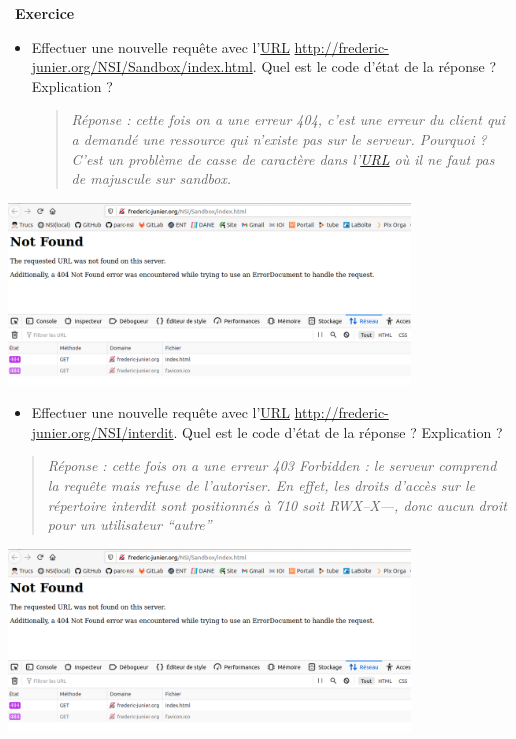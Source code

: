 \documentclass[
  11pt,
]{article}
\providecommand{\tightlist}{%
  \setlength{\itemsep}{0pt}\setlength{\parskip}{0pt}}
\newcounter{exo}
\newenvironment{exercice}[1]
{\par \medskip   \addtocounter{exo}{1} \noindent  
\begin{bclogo}[arrondi =0.1,   noborder = true, logo=\bccrayon, marge=4]{~\textbf{Exercice} \textbf{\theexo} {\itshape #1} }  \par}
{
\end{bclogo}
 \par \bigskip }
\begin{document}
\begin{exercice}{}
\begin{enumerate}
  \begin{itemize}
  \item
    Effectuer une nouvelle requête avec
    l'\href{https://developer.mozilla.org/fr/docs/Glossaire/URL}{URL}
    \url{http://frederic-junier.org/NSI/Sandbox/index.html}. Quel est le
    code d'état de la réponse ? Explication ?

    \begin{quote}
    \emph{Réponse : cette fois on a une erreur 404, c'est une erreur du
    client qui a demandé une ressource qui n'existe pas sur le serveur.
    Pourquoi ? C'est un problème de casse de caractère dans l'\url{URL}
    où il ne faut pas de majuscule sur sandbox.}
    \end{quote}
  \end{itemize}

  \includegraphics[width=0.8\textwidth,height=\textheight]{images/erreur_404.png}\\

  \begin{itemize}
  \tightlist
  \item
    Effectuer une nouvelle requête avec
    l'\href{https://developer.mozilla.org/fr/docs/Glossaire/URL}{URL}
    \url{http://frederic-junier.org/NSI/interdit}. Quel est le code
    d'état de la réponse ? Explication ?
  \end{itemize}

  \begin{quote}
  \emph{Réponse : cette fois on a une erreur 403 Forbidden : le serveur
  comprend la requête mais refuse de l'autoriser. En effet, les droits
  d'accès sur le répertoire interdit sont positionnés à 710 soit
  RWX--X---, donc aucun droit pour un utilisateur ``autre''}
  \end{quote}

  \includegraphics[width=0.8\textwidth,height=\textheight]{images/erreur_404.png}\\


\end{enumerate}
\end{exercice}
\end{document}
